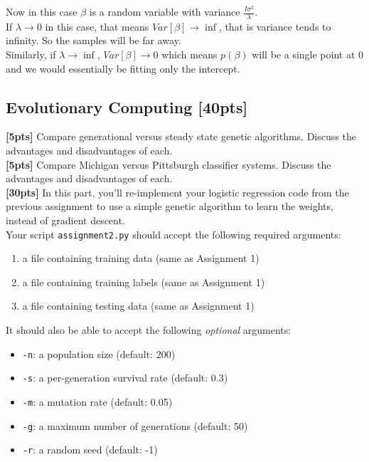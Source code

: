 \documentclass[paper=a4, fontsize=11pt]{scrartcl} %
\numberwithin{figure}{section} %
\numberwithin{table}{section} %
\begin{document}
Now in this case $\beta$ is a random variable with variance $\frac{I\sigma^{2}}{\lambda}$. \\
If $\lambda \to 0$ in this case, that means $Var[\beta] \to \inf$, that is variance tends to infinity. So the samples will be far away. \\
Similarly, if $\lambda \to \inf$, $Var[\beta] \to 0$ which means $p(\beta)$ will be a single point at $0$ and we would essentially be fitting only the intercept.

\subsection{Evolutionary Computing \textbf{[40pts]}}

\textbf{[5pts]} Compare generational versus steady state genetic algorithms. Discuss the advantages and disadvantages of each. \\

\textbf{[5pts]} Compare Michigan versus Pittsburgh classifier systems. Discuss the advantages and disadvantages of each. \\

\textbf{[30pts]} In this part, you'll re-implement your logistic regression code from the previous assignment to use a simple genetic algorithm to learn the weights, instead of gradient descent. \\

Your script \texttt{assignment2.py} should accept the following required arguments:

\begin{enumerate}
	\item a file containing training data (same as Assignment 1)
	\item a file containing training labels (same as Assignment 1)
	\item a file containing testing data (same as Assignment 1)
\end{enumerate}

It should also be able to accept the following \emph{optional} arguments:

\begin{itemize}
	\item \texttt{-n}: a population size (default: 200)
	\item \texttt{-s}: a per-generation survival rate (default: 0.3)
	\item \texttt{-m}: a mutation rate (default: 0.05)
	\item \texttt{-g}: a maximum number of generations (default: 50)
	\item \texttt{-r}: a random seed (default: -1)
\end{itemize}
\end{document}
